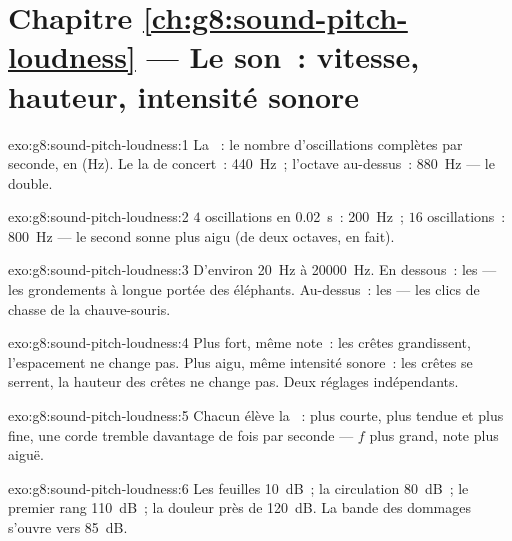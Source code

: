 \section*{Chapitre \ref{ch:g8:sound-pitch-loudness} --- Le son~: vitesse, hauteur, intensité sonore}

\begin{solution}{exo:g8:sound-pitch-loudness:1}
La ~: le nombre d'oscillations complètes par seconde, en
 (\unit{Hz}). Le la de concert~: \qty{440}{Hz}~; l'octave
au-dessus~: \qty{880}{Hz} --- le double.
\end{solution}

\begin{solution}{exo:g8:sound-pitch-loudness:2}
$4$ oscillations en \qty{0.02}{s}~: \qty{200}{Hz}~; $16$
oscillations~: \qty{800}{Hz} --- le second sonne plus aigu (de deux
octaves, en fait).
\end{solution}

\begin{solution}{exo:g8:sound-pitch-loudness:3}
D'environ \qty{20}{Hz} à \qty{20000}{Hz}. En dessous~: les 
--- les grondements à longue portée des éléphants. Au-dessus~: les
 --- les clics de chasse de la chauve-souris.
\end{solution}

\begin{solution}{exo:g8:sound-pitch-loudness:4}
Plus fort, même note~: les crêtes grandissent, l'espacement ne change
pas. Plus aigu, même intensité sonore~: les crêtes se serrent, la
hauteur des crêtes ne change pas. Deux réglages indépendants.
\end{solution}

\begin{solution}{exo:g8:sound-pitch-loudness:5}
Chacun élève la ~: plus courte, plus tendue et plus fine, une
corde tremble davantage de fois par seconde --- $f$ plus grand, note
plus aiguë.
\end{solution}

\begin{solution}{exo:g8:sound-pitch-loudness:6}
Les feuilles \qty{10}{dB}~; la circulation \qty{80}{dB}~; le premier
rang \qty{110}{dB}~; la douleur près de \qty{120}{dB}. La bande des
dommages s'ouvre vers \qty{85}{dB}.
\end{solution}

